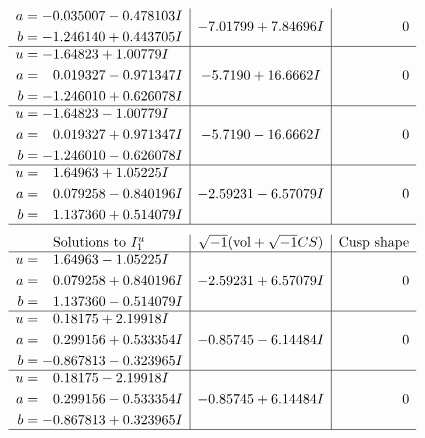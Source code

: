 \documentclass[1p]{elsarticle_modified}
\theoremstyle{definition}
\newcommand{\I}{\sqrt{-1}}
\begin{document}
$$\begin{array}{c|c|c}
\begin{aligned}
a &= -0.035007 - 0.478103 I \\
b &= -1.246140 + 0.443705 I\end{aligned}
 & -7.01799 + 7.84696 I & \phantom{-0.000000 } 0 \\ \hline\begin{aligned}
u &= -1.64823 + 1.00779 I \\
a &= \phantom{-}0.019327 - 0.971347 I \\
b &= -1.246010 + 0.626078 I\end{aligned}
 & -5.7190 + 16.6662 I & \phantom{-0.000000 } 0 \\ \hline\begin{aligned}
u &= -1.64823 - 1.00779 I \\
a &= \phantom{-}0.019327 + 0.971347 I \\
b &= -1.246010 - 0.626078 I\end{aligned}
 & -5.7190 - 16.6662 I & \phantom{-0.000000 } 0 \\ \hline\begin{aligned}
u &= \phantom{-}1.64963 + 1.05225 I \\
a &= \phantom{-}0.079258 - 0.840196 I \\
b &= \phantom{-}1.137360 + 0.514079 I\end{aligned}
 & -2.59231 - 6.57079 I & \phantom{-0.000000 } 0\\
 \hline 
 \end{array}$$\newpage$$\begin{array}{c|c|c}  
\text{Solutions to }I^u_{1}& \I (\text{vol} + \sqrt{-1}CS) & \text{Cusp shape}\\
 \hline 
\begin{aligned}
u &= \phantom{-}1.64963 - 1.05225 I \\
a &= \phantom{-}0.079258 + 0.840196 I \\
b &= \phantom{-}1.137360 - 0.514079 I\end{aligned}
 & -2.59231 + 6.57079 I & \phantom{-0.000000 } 0 \\ \hline\begin{aligned}
u &= \phantom{-}0.18175 + 2.19918 I \\
a &= \phantom{-}0.299156 + 0.533354 I \\
b &= -0.867813 - 0.323965 I\end{aligned}
 & -0.85745 - 6.14484 I & \phantom{-0.000000 } 0 \\ \hline\begin{aligned}
u &= \phantom{-}0.18175 - 2.19918 I \\
a &= \phantom{-}0.299156 - 0.533354 I \\
b &= -0.867813 + 0.323965 I\end{aligned}
 & -0.85745 + 6.14484 I & \phantom{-0.000000 } 0\\
 \hline 
 \end{array}$$\newpage\newpage\renewcommand{\arraystretch}{1}
\end{document}

